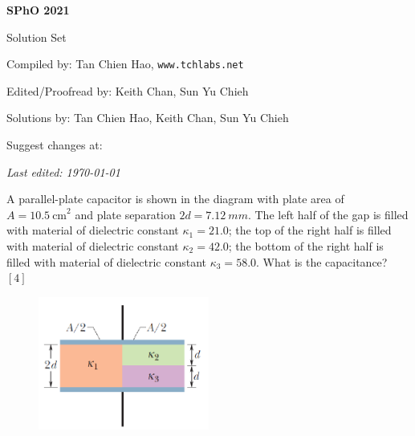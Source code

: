 \def\sphoyear{2021}
\setcounter{section}{0}
\setcounter{solcounter}{0}

\fancyhead[L]{\textbf{SPhO \sphoyear}} 


\begin{titlepage}
\centering

{\Huge\bfseries SPhO \sphoyear}

\vspace{1cm}

{\LARGE Solution Set}

\vspace{2cm}

{\Large Compiled by: Tan Chien Hao, \texttt{www.tchlabs.net}}

\vspace{2cm}

{\Large Edited/Proofread by: Keith Chan, Sun Yu Chieh}

\vspace{2cm}

{\Large Solutions by: Tan Chien Hao, Keith Chan, Sun Yu Chieh}

\vspace{2cm}

{\large Suggest changes at: \github}


\vfill

{\itshape Last edited: \today}
\end{titlepage}


\begin{problem}
    A parallel-plate capacitor is shown in the diagram with plate area of $A = \qty{10.5}{\cm}^2$ and plate separation $2d = \qty{7.12}{mm}$. The left half of the gap is filled with material of dielectric constant $\kappa_1 = 21.0$; the top of the right half is filled with material of dielectric constant $\kappa_2 = 42.0$; the bottom of the right half is filled with material of dielectric constant $\kappa_3 = 58.0$. What is the capacitance? \hfill $[4]$
    \begin{figure}[H]
        \centering
        \includegraphics[width=0.5\textwidth]{spho_book_TYS_images/2021SPhO_1.png}
        \label{fig:1}
    \end{figure}
\end{problem}

